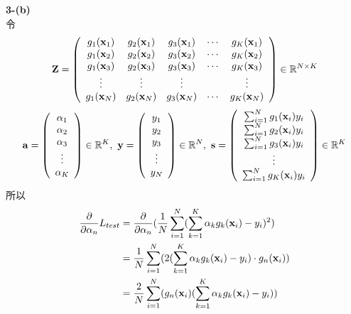 \documentclass{article}
\begin{document}
\noindent
{\bf 3-(b)}\\

\noindent
令
\begin{align*}
    {\bf Z} = 
    \left(
    \begin{array}{ccccc}
        g_1({\bf x}_1) & g_2({\bf x}_1) & g_3({\bf x}_1) & \cdots & g_K({\bf x}_1)\\
        g_1({\bf x}_2) & g_2({\bf x}_2) & g_3({\bf x}_2) & \cdots & g_K({\bf x}_2)\\
        g_1({\bf x}_3) & g_2({\bf x}_3) & g_3({\bf x}_3) & \cdots & g_K({\bf x}_3)\\
        \vdots & \vdots & \vdots & \  &\vdots\\
        g_1({\bf x}_N) & g_2({\bf x}_N) & g_3({\bf x}_N) & \cdots & g_K({\bf x}_N)\\
    \end{array}
    \right)
    \in {\mathbb R}^{N \times K}
\end{align*}
\begin{align*}
    {\bf a} = 
    \left(
    \begin{array}{c}
        \alpha_1\\
        \alpha_2\\
        \alpha_3\\
        \vdots\\
        \alpha_K
    \end{array}
    \right)
    \in {\mathbb R}^K,\ 
    {\bf y} = 
    \left(
    \begin{array}{c}
        y_1\\
        y_2\\
        y_3\\
        \vdots\\
        y_N
    \end{array}
    \right)
    \in {\mathbb R}^N,\ 
    {\bf s} = 
    \left(
    \begin{array}{c}
        \sum_{i = 1}^{N} g_1({\bf x}_i)y_i\\
        \sum_{i = 1}^{N} g_2({\bf x}_i)y_i\\
        \sum_{i = 1}^{N} g_3({\bf x}_i)y_i\\
        \vdots\\
        \sum_{i = 1}^{N} g_K({\bf x}_i)y_i\\
    \end{array}
    \right)
    \in {\mathbb R}^K
\end{align*}
所以
\begin{align*}
    \frac{\partial}{\partial \alpha_n} L_{test} &= \frac{\partial}{\partial \alpha_n} (\frac{1}{N} \sum_{i = 1}^{N} (\sum_{k = 1}^{K} \alpha_k g_k({\bf x}_i) - y_i)^2)\\
    &= \frac{1}{N} \sum_{i = 1}^{N} (2(\sum_{k = 1}^{K} \alpha_k g_k({\bf x}_i) - y_i) \cdot g_n({\bf x}_i))\\
    &= \frac{2}{N} \sum_{i = 1}^{N} (g_n({\bf x}_i) (\sum_{k = 1}^{K} \alpha_k g_k({\bf x}_i) - y_i))\\
\end{align*}
\end{document}
